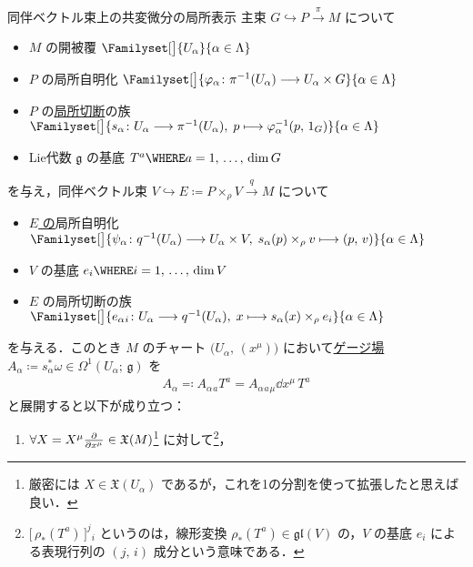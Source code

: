 \documentclass[geometry_main]{subfiles}
\begin{document}
\begin{mytheo}[label=thm:codv-assoc-local,breakable]{同伴ベクトル束上の共変微分の局所表示}
    主束 $G \hookrightarrow P \xrightarrow{\pi} M$ について
    \begin{itemize}
        \item $M$ の開被覆 $\Familyset[\big]{U_\alpha}{\alpha \in \Lambda}$
        \item $P$ の局所自明化 $\Familyset[\big]{\varphi_\alpha \colon \pi^{-1}(U_\alpha) \lto U_\alpha \times G}{\alpha \in \Lambda}$
        \item $P$ の\hyperref[def.section]{局所切断}の族 $\Familyset[\big]{s_\alpha \colon U_\alpha \lto \pi^{-1}(U_\alpha),\; p \lmto \varphi_\alpha^{-1}(p,\, 1_G)}{\alpha \in \Lambda}$
        \item Lie代数 $\mathfrak{g}$ の基底 $T^a \WHERE a = 1,\, \dots,\, \dim G$
    \end{itemize}
    を与え，同伴ベクトル束 $V \hookrightarrow E \coloneqq P \times_\rho V \xrightarrow{q} M$ について
    \begin{itemize}
        \item \underline{$E$ の}局所自明化 $\Familyset[\big]{\psi_\alpha \colon q^{-1}(U_\alpha) \lto U_\alpha \times V,\; s_\alpha(p) \times_\rho v \lmto (p,\, v)}{\alpha \in \Lambda}$
        \item $V$ の基底 $e_i \WHERE i = 1,\, \dots,\, \dim V$
        \item $E$ の局所切断の族 $\Familyset[\big]{e_\alpha{}_i \colon U_\alpha \lto q^{-1}(U_\alpha),\; x \lmto s_\alpha (x) \times_\rho e_i}{\alpha \in \Lambda}$
    \end{itemize}
    を与える．このとき $M$ のチャート $\bigl(U_\alpha,\, (x^\mu)\bigr)$ において\hyperref[thm:local-connection]{ゲージ場} $A_\alpha \coloneqq s_\alpha^* \omega \in \Omega^{1}(U_\alpha;\, \mathfrak{g})$ を
    \begin{align}
        A_\alpha \eqqcolon A_{\alpha}{}_a T^a = A_{\alpha}{}_a{}_\mu \dd{x^\mu}\, T^a
    \end{align}
    と展開すると以下が成り立つ：
    \begin{enumerate}
        \item $\forall X = X^\mu \pdv{}{x^\mu} \in \mathfrak{X}(M)$\footnote{厳密には $X \in \mathfrak{X}(U_\alpha)$ であるが，これを1の分割を使って拡張したと思えば良い．} に対して\footnote{$ \bigl[\, \rho_*(T^a) \,\bigr]^j{}_i$ というのは，線形変換 $\rho_*(T^a) \in \mathfrak{gl}(V)$ の，$V$ の基底 $e_i$ による表現行列の $(j,\, i)$ 成分という意味である．}，

\end{enumerate}
\end{mytheo}
\end{document}
